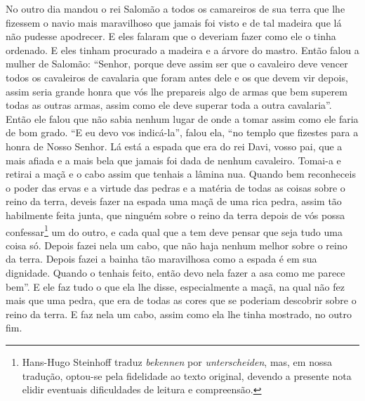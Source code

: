 No outro dia mandou o rei Salomão a todos os camareiros de sua terra que lhe
fizessem o navio mais maravilhoso que jamais foi visto e de tal madeira que lá
não pudesse apodrecer. E eles falaram que o deveriam fazer como ele o tinha
ordenado. E eles tinham procurado a madeira e a árvore do mastro. Então falou a
mulher de Salomão: “Senhor, porque deve assim ser que o cavaleiro deve vencer
todos os cavaleiros de cavalaria que foram antes dele e os que devem vir
depois, assim seria grande honra que vós lhe prepareis algo de armas que bem
superem todas as outras armas, assim como ele deve superar toda a outra
cavalaria”. Então ele falou que não sabia nenhum lugar de onde a tomar
assim como ele faria de bom grado. “E eu devo vos indicá-la”, falou ela, “no
templo que fizestes para a honra de Nosso Senhor. Lá está a espada que era do
rei Davi, vosso pai, que a mais afiada e a mais bela que jamais foi dada de
nenhum cavaleiro. Tomai-a e retirai a maçã e o cabo assim que tenhais a lâmina
nua. Quando bem reconheceis o poder das ervas e a virtude das pedras e a
matéria de todas as coisas sobre o reino da terra, deveis fazer na espada uma
maçã de uma rica pedra, assim tão habilmente feita junta, que ninguém sobre o
reino da terra depois de vós possa confessar\footnote{ Hans-Hugo Steinhoff
traduz \textit{bekennen}  por \textit{unterscheiden},
mas, em nossa tradução, optou-se pela fidelidade ao texto
original, devendo a presente nota elidir eventuais dificuldades de leitura e
compreensão.}  um do outro, e cada qual que a tem deve pensar que
seja tudo uma coisa só. Depois fazei nela um cabo, que não haja nenhum melhor
sobre o reino da terra. Depois fazei a bainha tão maravilhosa como a espada é
em sua dignidade. Quando o tenhais feito, então devo nela fazer a asa como me
parece bem”. E ele faz tudo o que ela lhe disse, especialmente a maçã, na qual
não fez mais que uma pedra, que era de todas as cores que se poderiam descobrir
sobre o reino da terra. E faz nela um cabo, assim como ela lhe tinha mostrado,
no outro fim. 

